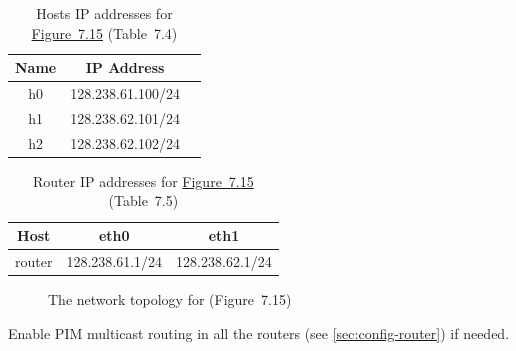 \documentclass{../UTNetLab}
\begin{document}
\begin{table}[H]
    \caption{Hosts IP addresses for \hyperref[fig:7.15]{Figure~7.15} (Table~7.4)}
    \label{tab:7.4}
    \centering
    \begin{tabular}{ *3c }
        \hline \hline
        Name & IP Address        \\
        \hline
        h0   & 128.238.61.100/24 \\
        h1   & 128.238.62.101/24 \\
        h2   & 128.238.62.102/24 \\
        \hline \hline
    \end{tabular}
\end{table}

\begin{table}[H]
    \caption{Router IP addresses for \hyperref[fig:7.15]{Figure~7.15} (Table~7.5)}
    \label{tab:7.5}
    \centering
    \begin{tabular}{ *3c }
        \hline \hline
        Host   & eth0            & eth1            \\
        \hline
        router & 128.238.61.1/24 & 128.238.62.1/24 \\
        \hline \hline
    \end{tabular}
\end{table}

\begin{figure}[H]
    \centering
    \caption{The network topology for  (Figure~7.15)}
    \label{fig:7.15}
\end{figure}

Enable PIM multicast routing in all the routers (see \autoref{sec:config-router}) if needed.
\end{document}
